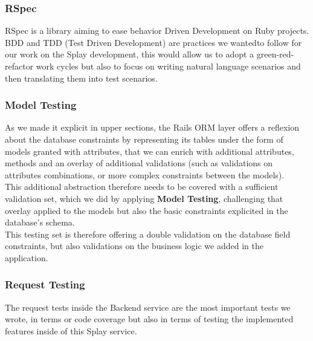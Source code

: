 \documentclass{eplmastersthesis}
\begin{document}
        \subsubsection{RSpec}

          RSpec \cite{rspec} is a library aiming to ease behavior Driven
          Development on Ruby projects. BDD and TDD (Test Driven Development) are
          practices we wantedto follow for our work on the Splay development,
          this would allow us to adopt a green-red-refactor work cycles but also
          to focus on writing natural language scenarios and then translating
          them into test scenarios.

        \subsubsection{Model Testing}

          As we made it explicit in upper sections, the Rails ORM layer offers
          a reflexion about the database constraints by representing its
          tables under the form of models granted with attributes, that we can
          enrich with additional attributes, methods and an overlay of
          additional validations (such as validations on attributes
          combinations, or more complex constraints between the models).\\

          This additional abstraction therefore needs to be covered with a
          sufficient validation set, which we did by applying
          \textbf{Model Testing}, challenging that overlay applied to the
          models but also the basic constraints explicited in the database's
          schema.\\

          This testing set is therefore offering a double validation on the
          database field constraints, but also validations on the business
          logic we added in the application.

        \subsubsection{Request Testing}

          The request tests inside the Backend service are the most important
          tests we wrote, in terms or code coverage but also in terms of
          testing the implemented features inside of this Splay service.\\
\end{document}
